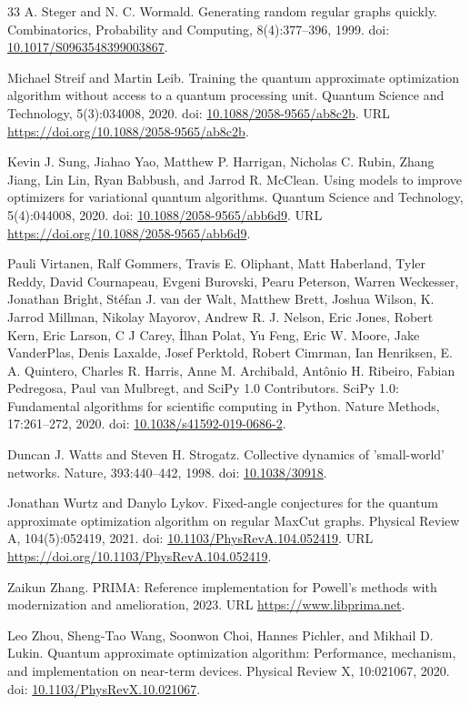 \documentclass[11pt]{article}
\begin{document}
\begin{thebibliography}{33}
A. Steger and N. C. Wormald. Generating random regular graphs quickly. Combinatorics, Probability and Computing, 8(4):377--396, 1999. doi: \href{https://doi.org/10.1017/S0963548399003867}{10.1017/S0963548399003867}.

Michael Streif and Martin Leib. Training the quantum approximate optimization algorithm without access to a quantum processing unit. Quantum Science and Technology, 5(3):034008, 2020. doi: \href{https://doi.org/10.1088/2058-9565/ab8c2b}{10.1088/2058-9565/ab8c2b}. URL \url{https://doi.org/10.1088/2058-9565/ab8c2b}.

Kevin J. Sung, Jiahao Yao, Matthew P. Harrigan, Nicholas C. Rubin, Zhang Jiang, Lin Lin, Ryan Babbush, and Jarrod R. McClean. Using models to improve optimizers for variational quantum algorithms. Quantum Science and Technology, 5(4):044008, 2020. doi: \href{https://doi.org/10.1088/2058-9565/abb6d9}{10.1088/2058-9565/abb6d9}. URL \url{https://doi.org/10.1088/2058-9565/abb6d9}.

Pauli Virtanen, Ralf Gommers, Travis E. Oliphant, Matt Haberland, Tyler Reddy, David Cournapeau, Evgeni Burovski, Pearu Peterson, Warren Weckesser, Jonathan Bright, St\'efan J. van der Walt, Matthew Brett, Joshua Wilson, K. Jarrod Millman, Nikolay Mayorov, Andrew R. J. Nelson, Eric Jones, Robert Kern, Eric Larson, C J Carey, \.Ilhan Polat, Yu Feng, Eric W. Moore, Jake VanderPlas, Denis Laxalde, Josef Perktold, Robert Cimrman, Ian Henriksen, E. A. Quintero, Charles R. Harris, Anne M. Archibald, Ant\^onio H. Ribeiro, Fabian Pedregosa, Paul van Mulbregt, and SciPy 1.0 Contributors. SciPy 1.0: Fundamental algorithms for scientific computing in Python. Nature Methods, 17:261--272, 2020. doi: \href{https://doi.org/10.1038/s41592-019-0686-2}{10.1038/s41592-019-0686-2}.

Duncan J. Watts and Steven H. Strogatz. Collective dynamics of 'small-world' networks. Nature, 393:440--442, 1998. doi: \href{https://doi.org/10.1038/30918}{10.1038/30918}.

Jonathan Wurtz and Danylo Lykov. Fixed-angle conjectures for the quantum approximate optimization algorithm on regular MaxCut graphs. Physical Review A, 104(5):052419, 2021. doi: \href{https://doi.org/10.1103/PhysRevA.104.052419}{10.1103/PhysRevA.104.052419}. URL \url{https://doi.org/10.1103/PhysRevA.104.052419}.

Zaikun Zhang. PRIMA: Reference implementation for Powell's methods with modernization and amelioration, 2023. URL \url{https://www.libprima.net}.

Leo Zhou, Sheng-Tao Wang, Soonwon Choi, Hannes Pichler, and Mikhail D. Lukin. Quantum approximate optimization algorithm: Performance, mechanism, and implementation on near-term devices. Physical Review X, 10:021067, 2020. doi: \href{https://doi.org/10.1103/PhysRevX.10.021067}{10.1103/PhysRevX.10.021067}.

\end{thebibliography}
\end{document}
